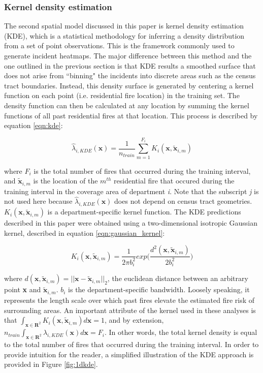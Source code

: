 \documentclass{svjour3}
\begin{document}
\subsubsection{Kernel density estimation}
\label{sec:kde}
The second spatial model discussed in this paper is kernel density estimation (KDE), which is a statistical methodology for inferring a density distribution from a set of point observations. This is the framework commonly used to generate incident heatmaps. The major difference between this method and the one outlined in the previous section is that KDE results  a smoothed surface that does not arise from ``binning" the incidents into discrete areas such as the census tract boundaries. Instead, this density surface is generated by centering a kernel function on each point (i.e. residential fire location) in the training set. The density function can then be calculated at any location by summing the kernel functions of all past residential fires at that location. This process is described by equation \ref{eqn:kde}:

\begin{equation}
  \label{eqn:kde}
  \hat\lambda_{i,KDE}(\textbf{x}) = \frac{1}{n_{train}}\sum_{m=1}^{F_i}K_i(\textbf{x},\tilde{\textbf{x}}_{i,m})
\end{equation}

\noindent where $F_i$ is the total number of fires that occurred during the training interval, and $\tilde{\textbf{x}}_{i,m}$ is the location of the $m^{th}$ residential fire that occured during the training interval in the coverage area of department \textit{i}. Note that the subscript \textit{j} is not used here because $\hat\lambda_{i,KDE}(\textbf{x})$ does not depend on census tract geometries. $K_i(\textbf{x},\tilde{\textbf{x}}_{i,m})$ is a department-specific kernel function. The KDE predictions described in this paper were obtained using a two-dimensional isotropic Gaussian kernel, described in equation \ref{eqn:gaussian_kernel}:

\begin{equation}
  \label{eqn:gaussian_kernel}
  K_i(\textbf{x},\tilde{\textbf{x}}_{i,m}) = \frac{1}{2\pi b_{i}^2}exp\bigg(\frac{d^2(\textbf{x},\tilde{\textbf{x}}_{i,m})}{2b_{i}^2}\bigg)
\end{equation}

\noindent where $d(\textbf{x},\tilde{\textbf{x}}_{i,m})= ||\textbf{x} - \tilde{\textbf{x}}_{i,m}||_2$, the euclidean distance between an arbitrary point \textbf{x} and $\tilde{\textbf{x}}_{i,m}$. $b_i$ is the department-specific bandwidth. Loosely speaking, it represents the length scale over which past fires elevate the estimated fire risk of surrounding areas. An important attribute of the kernel used in these analyses is that $\int_{\textbf{x} \in \textbf{R}^2}K_i(\textbf{x},\tilde{\textbf{x}}_{i,m})d\textbf{x} = 1$, and by extension, $n_{train}\int_{\textbf{x} \in \textbf{R}^2}\hat\lambda_{i,KDE}(\textbf{x}) d\textbf{x} = F_i$. In other words, the total kernel density is equal to the total number of fires that occurred during the training interval. In order to provide intuition for the reader, a simplified illustration of the KDE approach is provided in Figure \ref{fig:1dkde}.
\end{document}
